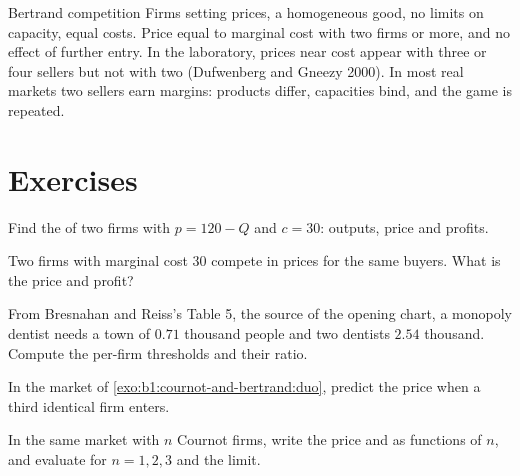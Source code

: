 \begin{model}{Bertrand competition}
\assumes Firms setting prices, a homogeneous good, no limits on capacity,
equal costs.
\predicts Price equal to marginal cost with two firms or more, and no
effect of further entry.
\tested In the laboratory, prices near cost appear with three or four
sellers but not with two (Dufwenberg and Gneezy 2000). %
\breaks In most real markets two sellers earn margins: products differ,
capacities bind, and the game is repeated.
\end{model}

\section*{Exercises}\label{sec:b1:cournot-and-bertrand:exercises}

\begin{exercise}[$\star$]\label{exo:b1:cournot-and-bertrand:duo}
Find the  of two firms with $p = 120 - Q$ and $c = 30$: outputs,
price and profits.
\end{exercise}

\begin{exercise}[$\star$]\label{exo:b1:cournot-and-bertrand:bert}
Two firms with marginal cost 30 compete in prices for the same buyers.
What is the  price and profit?
\end{exercise}

\begin{exercise}[$\star$]\label{exo:b1:cournot-and-bertrand:read}
From Bresnahan and Reiss's Table 5, the source of the opening chart, a
monopoly dentist needs a town of $0.71$
thousand people and two dentists $2.54$ thousand. %
Compute the per-firm thresholds and their ratio.
\end{exercise}

\begin{exercise}[$\star$]\label{exo:b1:cournot-and-bertrand:third}
In the market of \cref{exo:b1:cournot-and-bertrand:duo}, predict the price
when a third identical firm enters.
\end{exercise}

\begin{exercise}[$\star\star$]\label{exo:b1:cournot-and-bertrand:surplus}
In the same market with $n$ Cournot firms, write the price and  as functions of $n$, and evaluate for $n = 1, 2, 3$ and the limit.
\end{exercise}

